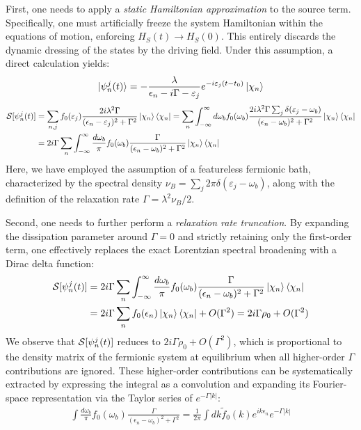 \documentclass[twocolumn, prx, reprint, amsfonts, amsmath, amssymb, longbibliography, floatfix, aps]{revtex4-2}
\begin{document}
First, one needs to apply a {\it static Hamiltonian approximation} to the source term. Specifically, one must artificially freeze the system Hamiltonian within the equations of motion, enforcing $H_S(t) \to H_S(0)$. This entirely discards the dynamic dressing of the states by the driving field. Under this assumption, a direct calculation yields:
\begin{equation}
    \ket{\psi^{j}_n (t)} = - \frac{\lambda}{\epsilon_n - i\Gamma - \varepsilon_j} e^{-i\varepsilon_j (t-t_0)} \ket{\chi_n}
\end{equation}
\begin{equation}
    \begin{aligned}
        {\cal S}[\psi^{j}_n (t)] & =  \sum_{n, j} f_0(\varepsilon_j) \frac{2i\lambda^2 \Gamma}{(\epsilon_n - \varepsilon_j)^2 + \Gamma^2} \ket{\chi_n}\bra{\chi_n} = \sum_{n}\int^{\infty}_{-\infty} d\omega_b f_0(\omega_b) \frac{2i\lambda^2 \Gamma \sum_{j} \delta(\varepsilon_j - \omega_b)}{(\epsilon_n - \omega_b)^2 + \Gamma^2} \ket{\chi_n}\bra{\chi_n} \\
        & = 2i\Gamma \sum_{n} \int^{\infty}_{-\infty} \frac{d\omega_b}{\pi}  f_0(\omega_b) \frac{\Gamma}{(\epsilon_n - \omega_b)^2 + \Gamma^2} \ket{\chi_n}\bra{\chi_n}
    \end{aligned}
\end{equation}
Here, we have employed the assumption of a featureless fermionic bath, characterized by the spectral density $\nu_B = \sum_{j} 2\pi \delta(\varepsilon_j - \omega_b)$, along with the definition of the relaxation rate $\Gamma = \lambda^2 \nu_B / 2$.

Second, one needs to further perform a {\it relaxation rate truncation}. By expanding the dissipation parameter around $\Gamma = 0$ and strictly retaining only the first-order term, one effectively replaces the exact Lorentzian spectral broadening with a Dirac delta function:
\begin{equation}
    \begin{aligned}
        {\cal S}[\psi^{j}_n (t)] & = 2i\Gamma \sum_{n} \int^{\infty}_{-\infty} \frac{d\omega_b}{\pi} f_0(\omega_b) \frac{\Gamma}{(\epsilon_n - \omega_b)^2 + \Gamma^2} \ket{\chi_n}\bra{\chi_n} \\
        & =  2i\Gamma \sum_{n} f_0(\epsilon_n) \ket{\chi_n}\bra{\chi_n} + O(\Gamma^2) = 2i\Gamma \rho_0 + O(\Gamma^2)
    \end{aligned}
\end{equation}
We observe that ${\cal S}[\psi^{j}_n (t)]$ reduces to $2i\Gamma \rho_0 + O(\Gamma^2) $, which is proportional to the density matrix of the fermionic system at equilibrium when all higher-order $\Gamma$ contributions are ignored. These higher-order contributions can be systematically extracted by expressing the integral as a convolution and expanding its Fourier-space representation via the Taylor series of $e^{-\Gamma|k|}$:
\begin{align}
\int \frac{d \omega_b}{\pi} f_0\left(\omega_b\right) \frac{\Gamma}{\left(\epsilon_n-\omega_b\right)^2+\Gamma^2}=\frac{1}{2 \pi} \int d k \tilde{f}_0(k) e^{i k \epsilon_n} e^{-\Gamma|k|} 
\end{align}
\end{document}
